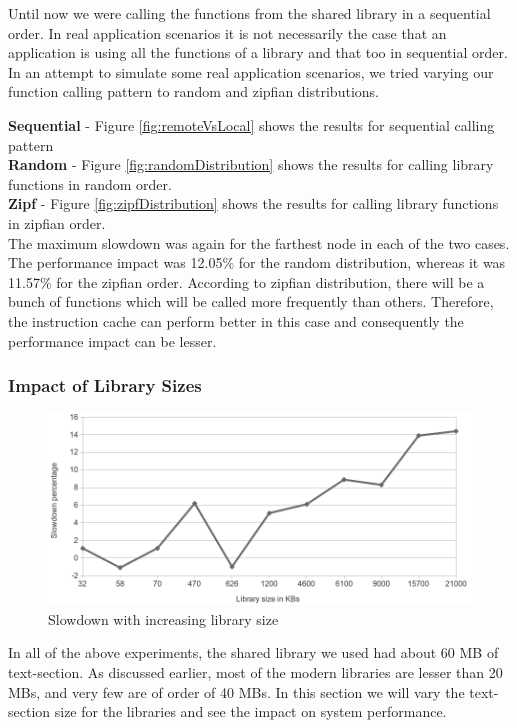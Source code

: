 Until now we were calling the functions from the shared library in a sequential order.
In real application scenarios it is not necessarily the case that an application is using all the functions 
of a library and that too in sequential order. In an attempt to simulate some real application scenarios,
we tried varying our function calling pattern to random and zipfian distributions.

\textbf{Sequential} - Figure \ref{fig:remoteVsLocal} shows the results for sequential calling pattern\\
\textbf{Random} - Figure \ref{fig:randomDistribution} shows the results for calling library functions in random order.\\
\textbf{Zipf} - Figure \ref{fig:zipfDistribution} shows the results for calling library functions in zipfian order.\\

The maximum slowdown was again for the farthest node in each of the two cases. The performance impact was 12.05\% for
the random distribution, whereas it was 11.57\% for the zipfian order. According to zipfian distribution,
there will be a bunch of functions which will be called more frequently than others. Therefore, the instruction cache
can perform better in this case and consequently the performance impact can be lesser.

\subsubsection{Impact of Library Sizes}

\begin{figure}
    \centering
    \includegraphics[scale=0.39]{slowdownWithSize.png}
    \caption{Slowdown with increasing library size }
    \label{fig:slowdownWithSize.png}
\end{figure}

In all of the above experiments, the shared library we used had about 60 MB of text-section.
As discussed earlier, most of the modern libraries are lesser than 20 MBs, and very few are of
order of 40 MBs. In this section we will vary the text-section size for the libraries and see 
the impact on system performance.

